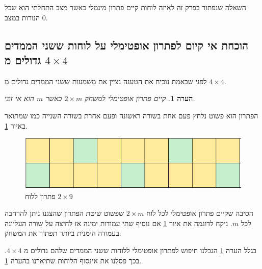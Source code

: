 \documentclass[12pt,leqno]{article}
\theoremstyle{theoremdd}
\newtheorem{comm}{הערה}
\begin{document}
השאלה שנפתור בפרק זה לאיזה לוחות קיים פתרון מינמלי כאשר מצב התחלתי הוא שכל הנורות במצב
$0$.

\subsection{הוכחת אי קיום לפתרון אופטימלי על לוחות ששני הממדים גדולים מ
\texorpdfstring{$4 \times 4$}{4 x 4}}
לפני שבאמת נוכיח את הטענה 
נציין את משמעות ששני הממדים גדולים מ
$4 \times 4$.
\begin{comm}
    \label{comm:sol to 2 x m}
    קיים פתרון אופטימלי למשחק 
    $2 \times m$
    כאשר 
    $m$
    הוא אי זוגי.
\end{comm}
הפתרון הוא פשוט נלחץ פעם אחת בשורה ראשונה ופעם אחרת בשורה השנייה כמו שמתואר באיור 
\ref{fig: 2x9 have min sol}.

\begin{figure}[ht]
    \caption{פתרון ללוח 
    $2 \times 9$}
    \label{fig: 2x9 have min sol}
    \centering
    \includegraphics[width=.5\textwidth,keepaspectratio]{images/2xm_sol.PNG}
\end{figure}

הסיבה שקיים פתרון אופטימלי לכל לוח 
$2 \times m$
שפשוט שיטת הפתרון שהצגנו ניתן להרחבה לכל 
$m$.
ניקח לדוגמה את איור 
\ref{fig: 2x9 have min sol}
אם נוסיף שתי עמודות ימינה 
אז לחיצה על שורה העליונה 
בעמודה הימנית ביותר תפתור את המשחק.

בגלל הערה 
\ref{comm:sol to 2 x m}
הגבלנו חיפוש לפתרון אופטימלי ללוחות 
ששני הממדים שלהם גדולים מ
$4 \times 4$.
בכך פסלנו את אינסוף הלוחות שתיארנו בהערה 
\ref{comm:sol to 2 x m}.
\end{document}
